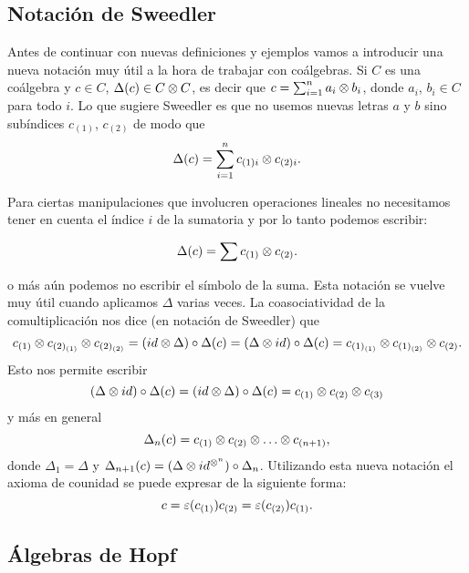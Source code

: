 \documentclass[a4paper,oneside,fleqn,11pt,../tesis.tex]{subfiles}
\begin{document}
\subsection{Notación de Sweedler}
Antes de continuar con nuevas definiciones y ejemplos vamos a introducir una nueva notación muy útil a la hora
de trabajar con coálgebras. Si $C$ es una coálgebra y $c \in C$, $\Delta(c) \in C \otimes C$, es decir que
$c = \sum_{i = 1}^n a_i \otimes b_i$, donde $a_i$, $b_i \in C$ para todo $i$. Lo que sugiere Sweedler es que no usemos nuevas
letras $a$ y $b$ sino subíndices $c_{(1)}$, $c_{(2)}$ de modo que
\[
	\Delta(c) = \sum_{i = 1}^n c_{(1)i} \otimes c_{(2)i}.
\]

Para ciertas manipulaciones que involucren operaciones lineales no necesitamos tener en cuenta el índice $i$ de la
sumatoria y por lo tanto podemos escribir:

\[
	\Delta(c) = \sum c_{(1)} \otimes c_{(2)}.
\]

o más aún podemos no escribir el símbolo de la suma. Esta notación se vuelve muy útil cuando aplicamos $\Delta$
varias veces. La coasociatividad de la comultiplicación nos dice (en notación de Sweedler) que
\[
	c_{(1)} \otimes c_{(2)_{(1)}} \otimes c_{(2)_{(2)}} = (id \otimes \Delta) \circ \Delta (c)
	= (\Delta \otimes id) \circ \Delta(c) = c_{(1)_{(1)}} \otimes c_{(1)_{(2)}} \otimes c_{(2)}.
\]
Esto nos permite escribir
\[
	(\Delta \otimes id) \circ \Delta (c) = (id \otimes \Delta) \circ \Delta(c) = c_{(1)} \otimes c_{(2)} \otimes c_{(3)}
\]
y más en general
\[
	\Delta_n(c) = c_{(1)} \otimes c_{(2)} \otimes \ldots \otimes c_{(n + 1)},
\]
donde $\Delta_1 = \Delta$ y $\Delta_{n + 1}(c) = (\Delta \otimes id^{\otimes^n}) \circ \Delta_{n}$.
Utilizando esta nueva notación el axioma de counidad se puede expresar de la siguiente forma:
\[
	c = \varepsilon(c_{(1)}) c_{(2)} = \varepsilon(c_{(2)}) c_{(1)}.
\]

\subsection{Álgebras de Hopf}
\end{document}

